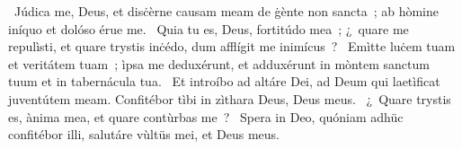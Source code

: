 \psalmChapterWithInscription{}
{ }
{%
~Júdica me, Deus, et disċèrne causam meam de ġènte non sancta~; ab hòmine iníquo et dolóso érue me. 
~Quia tu es, Deus, fortitúdo mea~; ¿~quare me repulìsti, et quare trystis inċédo, dum afflígit me inimícus~? 
~Emìtte luċem tuam et veritátem tuam~; ìpsa me deduxérunt, et adduxérunt in mòntem sanctum tuum et in tabernácula tua. 
~Et introíbo ad altáre Dei, ad Deum qui laetìficat juventútem meam. Confitébor tìbi in zìthara Deus, Deus meus. 
~¿~Quare trystis es, ànima mea, et quare contùrbas me~?  
~Spera in Deo, quóniam adhüc confitébor illi, salutáre vùltüs mei, et Deus meus. 
}
